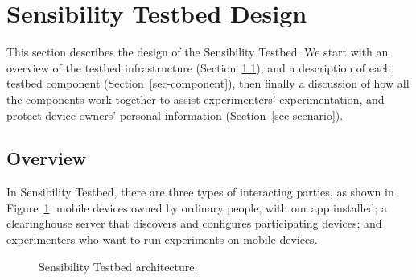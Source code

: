 \section{Sensibility Testbed Design}\label{sec-design}

This section describes the design of the Sensibility Testbed. 
We start with
an overview of the testbed infrastructure (Section~\ref{sec-overview}), 
and a description of each testbed component 
(Section~\ref{sec-component}), then finally a discussion of how all the 
components work together to assist experimenters' experimentation,
and protect device owners' personal information 
(Section~\ref{sec-scenario}).


\subsection{Overview}\label{sec-overview}

In Sensibility Testbed, there are three types of interacting
parties, as shown in Figure~\ref{fig-arch}: mobile devices 
owned by ordinary people, with our app installed; a 
clearinghouse server that discovers and configures
participating devices; and experimenters who want to run
experiments on mobile devices. 

\begin{figure}
\caption{\small Sensibility Testbed architecture. \label{fig-arch}}
\end{figure}

